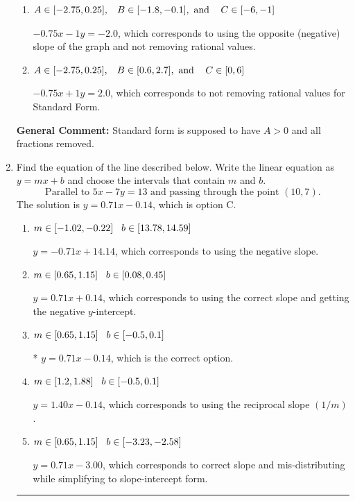 \documentclass{extbook}[14pt]
\newcommand{\litem}[1]{\item #1

\rule{\textwidth}{0.4pt}}
\begin{document}
\begin{enumerate}
{\begin{enumerate}[label=\Alph*.]
* $3x - 4y = -8$, which is the correct option.
\item \( A \in [-2.75, 0.25], \hspace{3mm} B \in [-1.8, -0.1], \text{ and } \hspace{3mm} C \in [-6, -1] \)

 $-0.75x - 1y = -2.0$, which corresponds to using the opposite (negative) slope of the graph and not removing rational values.
\item \( A \in [-2.75, 0.25], \hspace{3mm} B \in [0.6, 2.7], \text{ and } \hspace{3mm} C \in [0, 6] \)

 $-0.75x + 1y = 2.0$, which corresponds to not removing rational values for Standard Form.
\end{enumerate}

\textbf{General Comment:} Standard form is supposed to have $A > 0$ and all fractions removed.
}
\litem{
Find the equation of the line described below. Write the linear equation as $ y=mx+b $ and choose the intervals that contain $m$ and $b$.
\[ \text{Parallel to } 5 x - 7 y = 13 \text{ and passing through the point } (10, 7). \]
The solution is \( y = 0.71x - 0.14 \), which is option C.\begin{enumerate}[label=\Alph*.]
\item \( m \in [-1.02, -0.22] \hspace*{3mm} b \in [13.78, 14.59] \)

 $y = -0.71x + 14.14$, which corresponds to using the negative slope.
\item \( m \in [0.65, 1.15] \hspace*{3mm} b \in [0.08, 0.45] \)

 $y = 0.71x + 0.14$, which corresponds to using the correct slope and getting the negative $y$-intercept.
\item \( m \in [0.65, 1.15] \hspace*{3mm} b \in [-0.5, 0.1] \)

* $y = 0.71x - 0.14$, which is the correct option.
\item \( m \in [1.2, 1.88] \hspace*{3mm} b \in [-0.5, 0.1] \)

 $y = 1.40x - 0.14$, which corresponds to using the reciprocal slope $(1/m)$.
\item \( m \in [0.65, 1.15] \hspace*{3mm} b \in [-3.23, -2.58] \)

 $y = 0.71x - 3.00$, which corresponds to correct slope and mis-distributing while simplifying to slope-intercept form.
\end{enumerate}

}
\end{enumerate}
\end{document}
